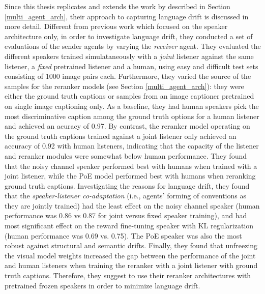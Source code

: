 Since this thesis replicates and extends the work by \cite{lazaridou2020multi} described in Section \ref{multi_agent_arch}, their approach to capturing language drift is discussed in more detail.
Different from previous work which focused on the speaker architecture only, in order to investigate language drift, they conducted a set of evaluations of the sender agents by varying the \emph{receiver} agent. They evaluated the different speakers trained simulataneously with a \textit{joint} listener against the same listener, a \textit{fixed} pretrained listener and a human, using easy and difficult test sets consisting of 1000 image pairs each. Furthermore, they varied the source of the samples for the reranker models (see Section \ref{multi_agent_arch}): they were either the ground truth captions or samples from an image captioner pretrained on single image captioning only. As a baseline, they had human speakers pick the most discriminative caption among the ground truth options for a human listener and achieved an acuracy of 0.97. By contrast, the reranker model operating on the ground truth captions trained against a joint listener only achieved an accuracy of 0.92 with human listeners, indicating that the capacity of the listener and reranker modules were somewhat below human performance. They found that the noisy channel speaker performed best with humans when trained with a joint listener, while the PoE model performed best with humans when reranking ground truth captions. Investigating the reasons for language drift, they found that the \emph{speaker-listener co-adaptation} (i.e., agents' forming of conventions as they are jointly trained) had the least effect on the noisy channel speaker (human performance was 0.86 vs 0.87 for joint versus fixed speaker training), and had most significant effect on the reward fine-tuning speaker with KL regularization (human performance was 0.69 vs. 0.75). The PoE speaker was also the most robust against structural and semantic drifts. Finally, they found that unfreezing the visual model weights increased the gap between the performance of the joint and human listeners when training the reranker with a joint listener with ground truth captions. Therefore, they suggest to use their reranker architectures with pretrained frozen speakers in order to minimize language drift.


